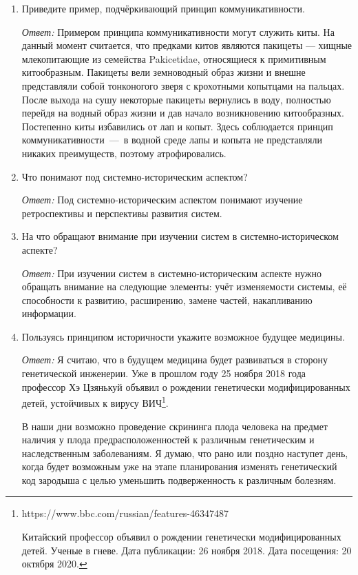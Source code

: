 \documentclass[10pt]{article}
\begin{document}
\begin{enumerate}
\item{Приведите пример, подчёркивающий принцип коммуникативности.}

  \emph{Ответ:} Примером принципа коммуникативности могут служить киты. На данный момент считается, что предками китов являются пакицеты --- хищные млекопитающие из семейства Pakicetidae, относящиеся к примитивным китообразным. Пакицеты вели земноводный образ жизни и внешне представляли собой тонконогого зверя с крохотными копытцами на пальцах. После выхода на сушу некоторые пакицеты вернулись в воду, полностью перейдя на водный образ жизни и дав начало возникновению китообразных. Постепенно киты избавились от лап и копыт. Здесь соблюдается принцип коммуникативности~---~в водной среде лапы и копыта не представляли никаких преимуществ, поэтому атрофировались.

\item{Что понимают под системно-историческим аспектом?}

  \emph{Ответ:} Под системно-историческим аспектом понимают изучение ретроспективы и перспективы развития систем.

\item{На что обращают внимание при изучении систем в системно-историческом аспекте?}

  \emph{Ответ:} При изучении систем в системно-историческим аспекте нужно обращать внимание на следующие элементы: учёт изменяемости системы, её способности к развитию, расширению, замене частей, накапливанию информации.

\item{Пользуясь принципом историчности укажите возможное будущее медицины.}

  \emph{Ответ:} Я считаю, что в будущем медицина будет развиваться в сторону генетической инженерии. Уже в прошлом году 25 ноября 2018 года профессор Хэ Цзянькуй объявил о рождении генетически модифицированных детей, устойчивых к вирусу ВИЧ\footnote{https://www.bbc.com/russian/features-46347487

    Китайский профессор объявил о рождении генетически модифицированных детей. Ученые в гневе. Дата публикации: 26 ноября 2018. Дата посещения: 20 октября 2020.}.

  В наши дни возможно проведение скрининга плода человека на предмет наличия у плода предрасположенностей к различным генетическим и наследственным заболеваниям. Я думаю, что рано или поздно наступет день, когда будет возможным уже на этапе планирования изменять генетический код зародыша с целью уменьшить подверженность к различным болезням.


\end{enumerate}
\end{document}

